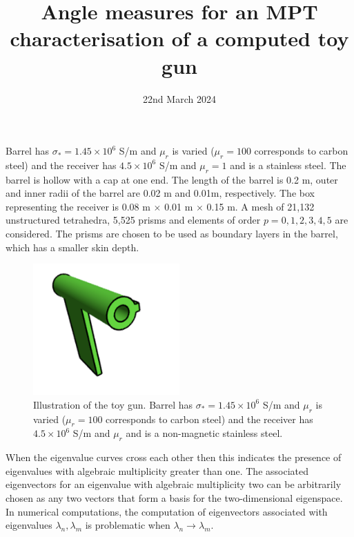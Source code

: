 \documentclass[a4paper,12]{article}
\theoremstyle{definition}
\begin{document}
\title{Angle measures for an MPT characterisation of a computed toy gun}
\date{22nd March 2024}
\maketitle

Barrel has $\sigma_* = 1.45\times 10^6$ S/m and $\mu_r$ is varied ($\mu_r=100$ corresponds to carbon steel) and the receiver has $4.5 \times 10^6$ S/m and $\mu_r=1$ and is a stainless steel.  The barrel is hollow with a cap at one end.  The length of the barrel is 0.2 m, outer and inner radii of the barrel are 0.02 m and 0.01m, respectively. The box representing the receiver is 0.08 m $\times$ 0.01 m $\times$ 0.15 m.  A mesh of 21,132 unstructured tetrahedra, 5,525 prisms and elements of order $p=0,1,2,3,4,5$ are considered. The prisms are chosen to be used as boundary layers in the barrel, which has a smaller skin depth. 

\begin{figure}[h]
\begin{center}
\includegraphics[width=0.5\textwidth]{Gun_modelv2_nonsym_StainSt.png}
\end{center}
\caption{Illustration of the toy gun. Barrel has $\sigma_* = 1.45\times 10^6$ S/m and $\mu_r$ is varied ($\mu_r=100$ corresponds to carbon steel) and the receiver has $4.5 \times 10^6$ S/m and $\mu_r$ and is a non-magnetic stainless steel.}
\end{figure}

When the eigenvalue curves  cross each other then this indicates the presence of eigenvalues with algebraic multiplicity greater than one.  The associated eigenvectors for an eigenvalue with algebraic multiplicity two 
 can be arbitrarily chosen as any two vectors that form a basis for the two-dimensional eigenspace.  In numerical computations, the computation of eigenvectors associated with eigenvalues $\lambda_n , \lambda_m$ is problematic when $\lambda_n \to \lambda_m$. 
\end{document}

